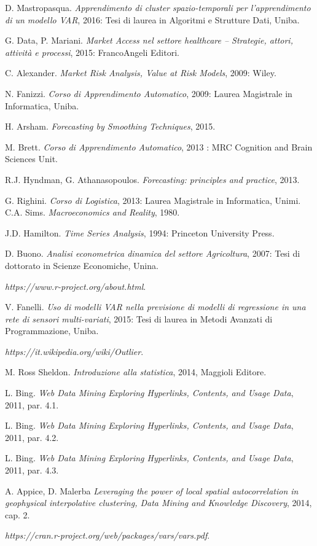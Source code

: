 \documentclass[12pt,a4paper,oneside,openright]{book}
\begin{document}
  \begin{thebibliography}{1}
   D. Mastropasqua. {\em Apprendimento di cluster spazio-temporali per l'apprendimento di un modello VAR}, 2016: Tesi di laurea in Algoritmi e Strutture Dati, Uniba.

   G. Data, P. Mariani. {\em Market Access nel settore healthcare – Strategie, attori, attività e processi}, 2015:  FrancoAngeli Editori.

   C. Alexander. {\em Market Risk Analysis, Value at Risk Models}, 2009: Wiley.

   N. Fanizzi. {\em Corso di Apprendimento Automatico}, 2009: Laurea Magistrale in Informatica, Uniba.
  
   H. Arsham. {\em Forecasting by Smoothing Techniques}, 2015.
  
   M. Brett. {\em Corso di Apprendimento Automatico}, 2013 : MRC Cognition and Brain Sciences Unit.
  
     R.J. Hyndman, G. Athanasopoulos. {\em Forecasting: principles and practice}, 2013.
    
     G. Righini. {\em Corso di Logistica}, 2013: Laurea Magistrale in Informatica, Unimi.
     C.A. Sims. {\em Macroeconomics and Reality}, 1980.
    
     J.D. Hamilton. {\em Time Series Analysis}, 1994: Princeton University Press.
   
     D. Buono. {\em Analisi econometrica dinamica del settore Agricoltura}, 2007: Tesi di dottorato in Scienze Economiche, Unina.
    
     {\em https://www.r-project.org/about.html}.
    
     V. Fanelli. {\em Uso di modelli VAR nella previsione di modelli di regressione in una rete di sensori multi-variati}, 2015: Tesi di laurea in Metodi Avanzati di Programmazione, Uniba.
    
      {\em https://it.wikipedia.org/wiki/Outlier}.
     
      M. Ross Sheldon. {\em Introduzione alla statistica}, 2014, Maggioli Editore.
      
      L. Bing. {\em Web Data Mining Exploring Hyperlinks, Contents, and Usage Data}, 2011, par. 4.1.
     
      L. Bing. {\em Web Data Mining Exploring Hyperlinks, Contents, and Usage Data}, 2011, par. 4.2.
     
      L. Bing. {\em Web Data Mining Exploring Hyperlinks, Contents, and Usage Data}, 2011, par. 4.3.
     
       A. Appice, D. Malerba {\em Leveraging the power of local spatial autocorrelation in geophysical interpolative clustering, Data Mining and Knowledge Discovery}, 2014, cap. 2.
          
      {\em https://cran.r-project.org/web/packages/vars/vars.pdf}.
      
  \end{thebibliography}
\end{document}
